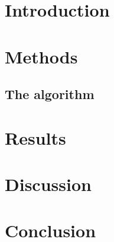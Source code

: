 \documentclass[english,notitlepage,reprint,nofootinbib]{revtex4-1}
\begin{document}
\title{}  %
\author{} %
\date{\today}                             %
\noaffiliation                            %

\begin{abstract}
    \end{abstract}
\maketitle


\section{Introduction}

%

\section{Methods}\label{sec:methods}
%

\subsection*{The algorithm}
%

\section{Results}\label{sec:results}
%
\section{Discussion}\label{sec:discussion}
%

\section{Conclusion}\label{sec:conclusion}

\onecolumngrid

%

\end{document}
